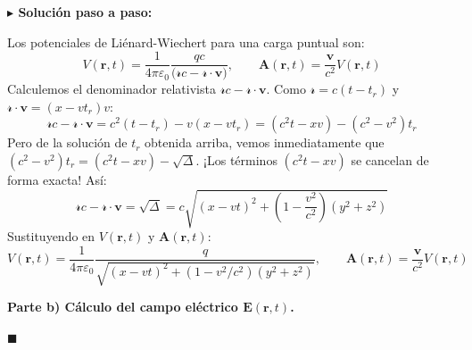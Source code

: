 \documentclass[11pt,a4paper]{book}
\newenvironment{solucion}{%
    \par\medskip\noindent\textbf{\color{blue!65!black}\Large $\blacktriangleright$ Solución paso a paso:}\par\medskip
}{%
    \hfill$\blacksquare$\par\bigskip
}
\newcommand{\Evec}{\bm{E}}
\newcommand{\Avec}{\bm{A}}
\newcommand{\rsep}{\boldsymbol{\mathscr{r}}}
\begin{document}
\begin{solucion}
Los potenciales de Liénard-Wiechert para una carga puntual son:
\begin{equation}
    V(\bm{r},t) = \frac{1}{4\pi\varepsilon_0} \frac{q c}{\big(\mathscr{r}c - \rsep\cdot\bm{v}\big)}, \qquad \Avec(\bm{r},t) = \frac{\bm{v}}{c^2} V(\bm{r},t)
\end{equation}
Calculemos el denominador relativista $\mathscr{r}c - \rsep\cdot\bm{v}$. Como $\mathscr{r} = c(t - t_r)$ y $\rsep\cdot\bm{v} = (x - vt_r)v$:
\begin{equation}
    \mathscr{r}c - \rsep\cdot\bm{v} = c^2(t - t_r) - v(x - vt_r) = (c^2 t - xv) - (c^2 - v^2)t_r
\end{equation}
Pero de la solución de $t_r$ obtenida arriba, vemos inmediatamente que $(c^2 - v^2)t_r = (c^2 t - xv) - \sqrt{\Delta}$. ¡Los términos $(c^2 t - xv)$ se cancelan de forma exacta! Así:
\begin{equation}
    \mathscr{r}c - \rsep\cdot\bm{v} = \sqrt{\Delta} = c\sqrt{(x - vt)^2 + \left(1 - \frac{v^2}{c^2}\right)(y^2 + z^2)}
\end{equation}
Sustituyendo en $V(\bm{r},t)$ y $\Avec(\bm{r},t)$:
\begin{equation}
    V(\bm{r},t) = \frac{1}{4\pi\varepsilon_0} \frac{q}{\sqrt{(x - vt)^2 + (1 - v^2/c^2)(y^2 + z^2)}}, \qquad \Avec(\bm{r},t) = \frac{\bm{v}}{c^2} V(\bm{r},t)
\end{equation}

\medskip
\textbf{Parte b) Cálculo del campo eléctrico $\Evec(\bm{r},t)$.}


\end{solucion}
\end{document}
